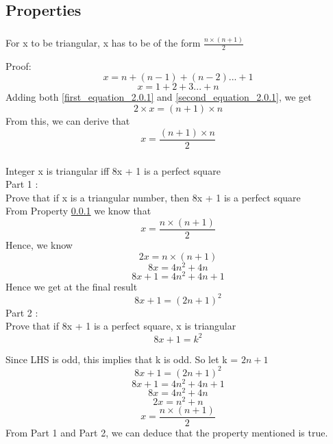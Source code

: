 \documentclass{article}
\begin{document}
\subsection*{ Properties }
\subsubsection{}\label{2.0.1}
For x to be triangular, x has to be of the form \(\frac{n\times(n+1)}{2}\)\newline

Proof:\\

\begin{equation}\label{first_equation_2.0.1}
    x = n + (n-1) + (n-2) . . . + 1
\end{equation}
\begin{equation}\label{second_equation_2.0.1}
    x = 1 + 2 + 3 . . . + n
\end{equation}
Adding both \ref{first_equation_2.0.1} and \ref{second_equation_2.0.1}, we get
\begin{equation}
    2 \times x = (n+1) \times n
\end{equation}
From this, we can derive that
\[
    x = \frac{(n+1) \times n}{2}
\]
\subsubsection{}\label{2.0.2}
Integer x is triangular iff 8x + 1 is a perfect square\\
Part 1 : \\

Prove that if x is a triangular number, then 8x + 1 is a perfect square \\

From Property \ref{2.0.1} we know that 
\[ x = \frac{n \times (n+1) }{2}\]
Hence, we know
\[ 2x = n \times (n+1) \]
\[ 8x = 4n^2 + 4n \]
\[ 8x + 1 = 4n^2 + 4n + 1 \]
Hence we get at the final result
\begin{equation}\label{first_equation_2.0.2}
    8x + 1 = ( 2n + 1 )^2
\end{equation}
\newpage
Part 2 : \\

Prove that if 8x + 1 is a perfect square, x is triangular \\
\[ 8x + 1 = k^2 \]

Since LHS is odd, this implies that k is odd. So let k = \( 2n + 1\)
\[ 8x + 1 = (2n + 1)^2 \]
\[ 8x + 1 = 4n^2 + 4n + 1 \]
\[ 8x = 4n^2 + 4n \]
\[ 2x = n^2 + n \]
\begin{equation}\label{second_equation_2.0.2}
    x = \frac{n \times (n+1) }{2}
\end{equation}
From Part 1 and Part 2, we can deduce that the property mentioned is true.
\end{document}
